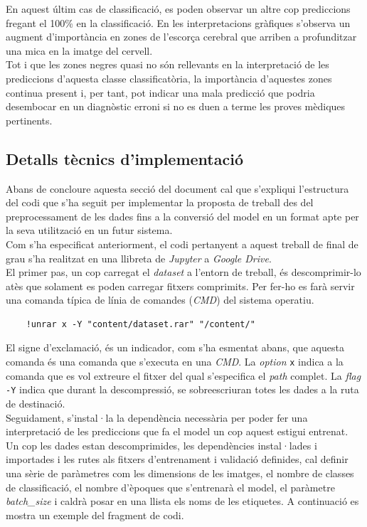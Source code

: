 \documentclass[a4paper,12pt]{report}
\begin{document}
\newline
En aquest últim cas de classificació, es poden observar un altre cop prediccions fregant el 100\% en la classificació. En les interpretacions gràfiques s'observa un augment d'importància en zones de l'escorça cerebral que arriben a profunditzar una mica en la imatge del cervell.\\
Tot i que les zones negres quasi no són rellevants en la interpretació de les prediccions d'aquesta classe classificatòria, la importància d'aquestes zones continua present i, per tant, pot indicar una mala predicció que podria desembocar en un diagnòstic erroni si no es duen a terme les proves mèdiques pertinents.
\subsection*{Detalls tècnics d'implementació}
Abans de concloure aquesta secció del document cal que s'expliqui l'estructura del codi que s'ha seguit per implementar la proposta de treball des del preprocessament de les dades fins a la conversió del model en un format apte per la seva utilització en un futur sistema.\\
Com s'ha especificat anteriorment, el codi pertanyent a aquest treball de final de grau s'ha realitzat en una llibreta de \textit{Jupyter} a \textit{Google Drive}.\\
El primer pas, un cop carregat el \textit{dataset} a l'entorn de treball, és descomprimir-lo atès que solament es poden carregar fitxers comprimits. Per fer-ho es farà servir una comanda típica de línia de comandes (\textit{CMD}) del sistema operatiu.
\begin{lstlisting}
    !unrar x -Y "content/dataset.rar" "/content/"
\end{lstlisting}
El signe d'exclamació, és un indicador, com s'ha esmentat abans, que aquesta comanda és una comanda que s'executa en una \textit{CMD}. La \textit{option} \texttt{x} indica a la comanda que es vol extreure el fitxer del qual s'especifica el \textit{path} complet. La \textit{flag} \texttt{-Y} indica que durant la descompressió, se sobreescriuran totes les dades a la ruta de destinació.\\
Seguidament, s'instal·la la dependència necessària per poder fer una interpretació de les prediccions que fa el model un cop aquest estigui entrenat.\\
Un cop les dades estan descomprimides, les dependències instal·lades i importades i les rutes als fitxers d'entrenament i validació definides, cal definir una sèrie de paràmetres com les dimensions de les imatges, el nombre de classes de classificació, el nombre d'èpoques que s'entrenarà el model, el paràmetre \textit{batch\_size} i caldrà posar en una llista els noms de les etiquetes. A continuació es mostra un exemple del fragment de codi.
\end{document}
